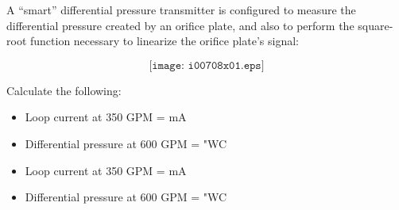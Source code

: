 

A ``smart'' differential pressure transmitter is configured to measure the differential pressure created by an orifice plate, and also to perform the square-root function necessary to linearize the orifice plate's signal:

$$\texttt{[image: i00708x01.eps]}$$

Calculate the following:

\begin{itemize}
\item{} Loop current at 350 GPM = \underbar{\hskip 50pt} mA
\vskip 5pt
\item{} Differential pressure at 600 GPM = \underbar{\hskip 50pt} "WC
\end{itemize}







\begin{itemize}
\item{} Loop current at 350 GPM =  mA
\vskip 5pt
\item{} Differential pressure at 600 GPM =  "WC
\end{itemize}











